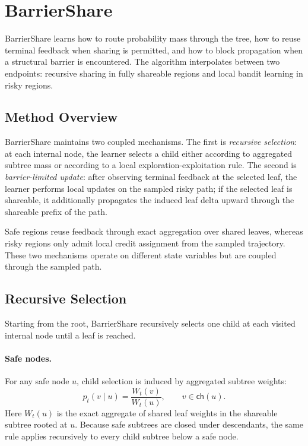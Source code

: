 \documentclass{article}
\begin{document}
\section{BarrierShare}
\label{sec:barriershare}

BarrierShare learns how to route probability mass through the tree, how to reuse terminal feedback when sharing is permitted, and how to block propagation when a structural barrier is encountered. The algorithm interpolates between two endpoints: recursive sharing in fully shareable regions and local bandit learning in risky regions.

\subsection{Method Overview}
\label{sec:barriershare_overview}

BarrierShare maintains two coupled mechanisms. The first is \emph{recursive selection}: at each internal node, the learner selects a child either according to aggregated subtree mass or according to a local exploration-exploitation rule. The second is \emph{barrier-limited update}: after observing terminal feedback at the selected leaf, the learner performs local updates on the sampled risky path; if the selected leaf is shareable, it additionally propagates the induced leaf delta upward through the shareable prefix of the path.

Safe regions reuse feedback through exact aggregation over shared leaves, whereas risky regions only admit local credit assignment from the sampled trajectory. These two mechanisms operate on different state variables but are coupled through the sampled path.

\subsection{Recursive Selection}
\label{sec:barriershare_selection}

Starting from the root, BarrierShare recursively selects one child at each visited internal node until a leaf is reached.

\paragraph{Safe nodes.}
For any safe node $u$, child selection is induced by aggregated subtree weights:
\begin{equation}
    p_t(v\mid u) = \frac{W_t(v)}{W_t(u)},
    \qquad v \in \mathsf{ch}(u).
    \label{eq:safe_selection}
\end{equation}
Here $W_t(u)$ is the exact aggregate of shared leaf weights in the shareable subtree rooted at $u$. Because safe subtrees are closed under descendants, the same rule applies recursively to every child subtree below a safe node.
\end{document}
